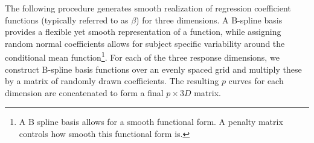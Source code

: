 The following procedure generates smooth realization of regression coefficient functions 
(typically referred to as \(\beta\)) for three dimensions.  A B-spline basis provides a flexible yet 
smooth representation of a function, while assigning random normal coefficients allows for subject specific variability 
around the conditional mean function\footnote{A B spline basis allows for a smooth functional form.  
A penalty matrix controls how smooth this functional form is.}.  For each of the three response dimensions, 
we construct B-spline basis functions 
over an evenly spaced grid and multiply these by a matrix of randomly drawn 
coefficients.  The resulting \(p\) curves for each dimension are concatenated to form 
a final \(p \times 3D\) matrix.